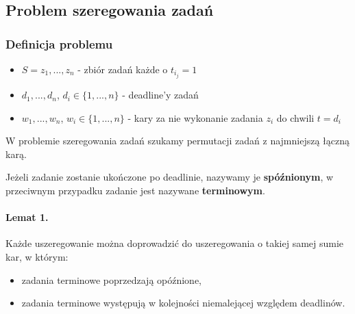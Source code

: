 \subsection{Problem szeregowania zadań}
\subsubsection{Definicja problemu}
\begin{itemize}
\item $S = {z_1, ... ,z_n}$ - zbiór zadań każde o $t_{i_j}=1$ 
\item $d_1, ... , d_n$,  $d_i \in \{1,...,n\}$ - deadline'y zadań 
\item $w_1, ... , w_n$, $w_i \in \{1,...,n\}$ - kary za nie wykonanie zadania $z_i$ do chwili $t=d_i$ \\
\end{itemize}
W problemie szeregowania zadań szukamy permutacji zadań z najmniejszą łączną karą. 

Jeżeli zadanie zostanie ukończone po deadlinie, nazywamy je \textbf{spóźnionym}, w przeciwnym przypadku zadanie jest nazywane \textbf{terminowym}. 

\paragraph{Lemat 1.}{Każde uszeregowanie można doprowadzić do uszeregowania o takiej samej sumie kar, w którym:}
\begin{itemize}
	\item zadania terminowe poprzedzają opóźnione,
	\item zadania terminowe występują w kolejności niemalejącej względem deadlinów.
\end{itemize}  

